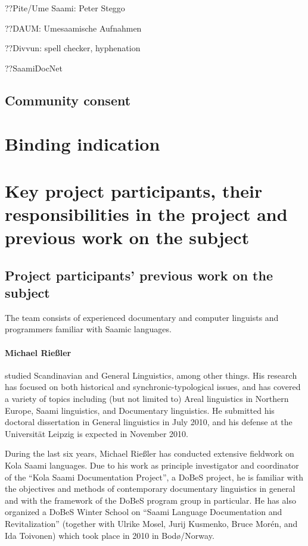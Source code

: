 \documentclass[a4paper,12pt]{article}
\begin{document}
??Pite/Ume Saami: Peter Steggo%

??DAUM: Umesaamische Aufnahmen%

??Divvun: spell checker, hyphenation

??SaamiDocNet%




\subsection{Community consent}

\section{Binding indication}

\section{Key project participants, their responsibilities in the project and previous work on the subject}

\subsection{Project participants' previous work on the subject}
The team consists of experienced documentary and computer linguists and programmers familiar with Saamic languages.

\paragraph{Michael Rießler} studied Scandinavian and General Linguistics, among other things. His research has focused on both historical and synchronic-typological issues, and has covered a variety of topics including (but not limited to) Areal linguistics in Northern Europe, Saami linguistics, and Documentary linguistics. He submitted his doctoral dissertation in General linguistics in July 2010, and his defense at the Universität Leipzig is expected in November 2010.

During the last six years, Michael Rießler has conducted extensive fieldwork on Kola Saami languages. Due to his work as principle investigator and coordinator of the “Kola Saami Documentation Project”, a DoBeS project, he is familiar with the objectives and methods of contemporary documentary linguistics in general and with the framework of the DoBeS program group in particular. He has also organized a DoBeS Winter School on “Saami Language Documentation and Revitalization” (together with Ulrike Mosel, Jurij Kusmenko, Bruce Morén, and Ida Toivonen) which took place in 2010 in Bodø/Norway.
\end{document}
